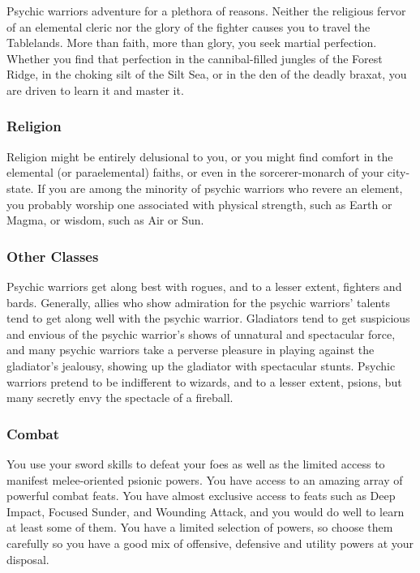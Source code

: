 Psychic warriors adventure for a plethora of reasons. Neither the religious fervor of an elemental cleric nor the glory of the fighter causes you to travel the Tablelands. More than faith, more than glory, you seek martial perfection. Whether you find that perfection in the cannibal-filled jungles of the Forest Ridge, in the choking silt of the Silt Sea, or in the den of the deadly braxat, you are driven to learn it and master it.


\subsubsection{Religion}
Religion might be entirely delusional to you, or you might find comfort in the elemental (or paraelemental) faiths, or even in the sorcerer-monarch of your city-state. If you are among the minority of psychic warriors who revere an element, you probably worship one associated with physical strength, such as Earth or Magma, or wisdom, such as Air or Sun.

\subsubsection{Other Classes}
Psychic warriors get along best with rogues, and to a lesser extent, fighters and bards. Generally, allies who show admiration for the psychic warriors' talents tend to get along well with the psychic warrior. Gladiators tend to get suspicious and envious of the psychic warrior's shows of unnatural and spectacular force, and many psychic warriors take a perverse pleasure in playing against the gladiator's jealousy, showing up the gladiator with spectacular stunts. Psychic warriors pretend to be indifferent to wizards, and to a lesser extent, psions, but many secretly envy the spectacle of a fireball.

\subsubsection{Combat}
You use your sword skills to defeat your foes as well as the limited access to manifest melee-oriented psionic powers. You have access to an amazing array of powerful combat feats. You have almost exclusive access to feats such as Deep Impact, Focused Sunder, and Wounding Attack, and you would do well to learn at least some of them. You have a limited selection of powers, so choose them carefully so you have a good mix of offensive, defensive and utility powers at your disposal.

